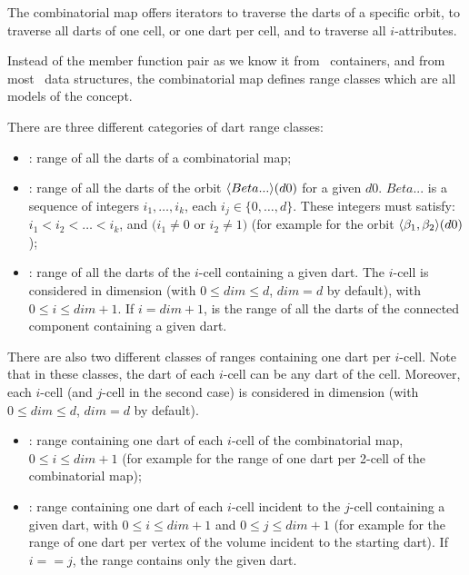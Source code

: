The combinatorial map offers iterators to traverse the darts
of a specific orbit, to traverse all darts of one cell, or
one dart per cell, and to traverse all $i$-attributes.

Instead of the  member function pair as we know it
from \stl\ containers, and from most \cgal\ data structures, the
combinatorial map defines range classes which are all models of the
 concept.

There are three different categories of dart range classes:
\begin{itemize}
\item {}: range of all the darts of a combinatorial map;
\item {}: range of all the darts of
  the orbit $\langle{}Beta...\rangle{}(d0)$ for a given $d0$.  $Beta...$ is a
  sequence of integers $i_1,\ldots,i_k$, each $i_j \in
  \{0,\ldots,d\}$. These integers must satisfy: $i_1<i_2<\ldots<i_k$,
  and $(i_1\neq 0$ or $i_2 \neq 1)$ (for example
   for the orbit
  $\langle{}\beta_{1},\beta_{2}\rangle{}(d0)$);
\item {}: range of all the darts of
  the $i$-cell containing a given dart. The $i$-cell is considered in
  dimension  (with $0 \leq dim \leq d$, $dim=d$ by default),
  with $0\leq i \leq dim+1$. If $i=dim+1$,
   is the range of all the darts of
  the connected component containing a given dart.
\end{itemize}


There are also two different classes of ranges containing one dart per
$i$-cell. Note that in these classes, the dart of each $i$-cell can
be any dart of the cell. Moreover, each $i$-cell (and $j$-cell in the
second case) is considered in dimension  (with $0 \leq dim
\leq d$, $dim=d$ by default).
\begin{itemize}
\item {}: range containing one dart of
  each $i$-cell of the combinatorial map, $0\leq i \leq dim+1$ (for
  example  for the range of one dart per
  2-cell of the combinatorial map);
\item {}: range
  containing one dart of each $i$-cell incident to the $j$-cell
  containing a given dart, with $0\leq i \leq dim+1$ and $0\leq j
  \leq dim+1$ (for example
   for the range of
  one dart per vertex of the volume incident to the starting dart).
  If $i==j$, the range contains only the given dart.
\end{itemize}

